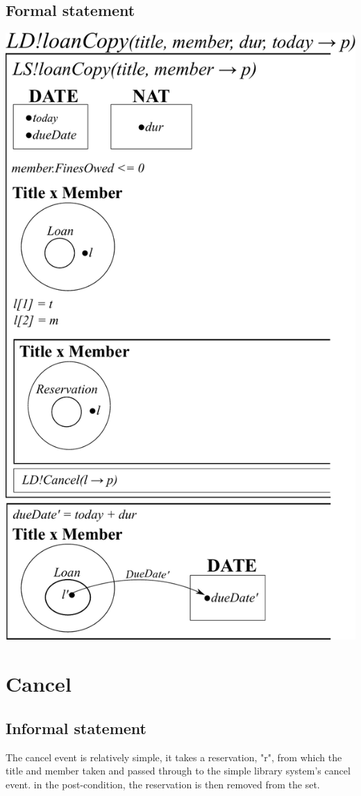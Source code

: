\documentclass[]{report}
\begin{document}
\subsection{Formal statement}
\begin{center}
	\includegraphics[scale=0.75]{loan_copy.pdf}
\end{center}
\newpage
\section{Cancel}
\subsection{Informal statement}
The cancel event is relatively simple, it takes a reservation, "r", from which the title and member taken and passed through to the simple library system's cancel event. in the post-condition, the reservation is then removed from the set.
\end{document}
